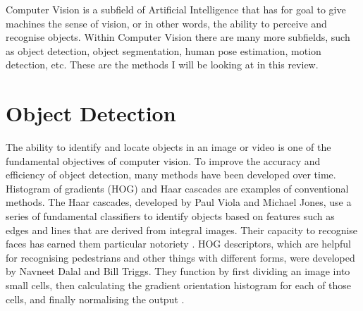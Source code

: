 




Computer Vision is a subfield of Artificial Intelligence that has for goal to give machines the sense of vision, or in other words, the ability to perceive and recognise objects. Within Computer Vision there are many more subfields, such as object detection, object segmentation, human pose estimation, motion detection, etc. These are the methods I will be looking at in this review.

\section{Object Detection}
    The ability to identify and locate objects in an image or video is one of the fundamental objectives of computer vision. To improve the accuracy and efficiency of object detection, many methods have been developed over time. Histogram of gradients (HOG) and Haar cascades are examples of conventional methods. The Haar cascades, developed by Paul Viola and Michael Jones, use a series of fundamental classifiers to identify objects based on features such as edges and lines that are derived from integral images. Their capacity to recognise faces has earned them particular notoriety \citep{viola2001rapid}. HOG descriptors, which are helpful for recognising pedestrians and other things with different forms, were developed by Navneet Dalal and Bill Triggs. They function by first dividing an image into small cells, then calculating the gradient orientation histogram for each of those cells, and finally normalising the output \citep{dalal2005histograms}.\\


